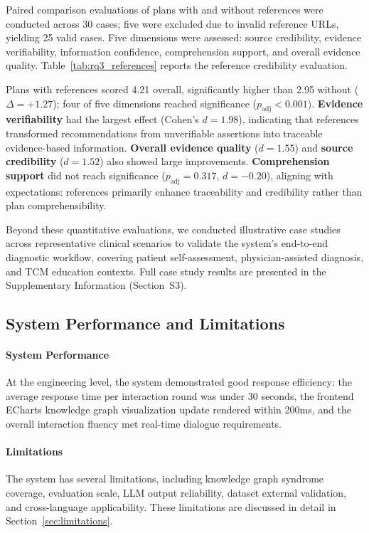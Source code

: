 Paired comparison evaluations of plans with and without references were conducted across 30 cases; five were excluded due to invalid reference URLs, yielding 25 valid cases.
Five dimensions were assessed: source credibility, evidence verifiability, information confidence, comprehension support, and overall evidence quality.
Table~\ref{tab:rq3_references} reports the reference credibility evaluation.



Plans with references scored 4.21 overall, significantly higher than 2.95 without ($\Delta=+1.27$); four of five dimensions reached significance ($p_{\mathrm{adj}}<0.001$).
\textbf{Evidence verifiability} had the largest effect (Cohen's $d=1.98$), indicating that references transformed recommendations from unverifiable assertions into traceable evidence-based information.
\textbf{Overall evidence quality} ($d=1.55$) and \textbf{source credibility} ($d=1.52$) also showed large improvements.
\textbf{Comprehension support} did not reach significance ($p_{\mathrm{adj}}=0.317$, $d=-0.20$), aligning with expectations: references primarily enhance traceability and credibility rather than plan comprehensibility.

Beyond these quantitative evaluations, we conducted illustrative case studies across representative clinical scenarios to validate the system's end-to-end diagnostic workflow, covering patient self-assessment, physician-assisted diagnosis, and TCM education contexts.
Full case study results are presented in the Supplementary Information (Section~S3).

\subsection{System Performance and Limitations}\label{sec:eval-limitations}

\paragraph{System Performance}
At the engineering level, the system demonstrated good response efficiency: the average response time per interaction round was under 30 seconds,
the frontend ECharts knowledge graph visualization update rendered within 200ms, and the overall interaction fluency met real-time dialogue requirements.

\paragraph{Limitations}
The system has several limitations, including knowledge graph syndrome coverage, evaluation scale, LLM output reliability, dataset external validation, and cross-language applicability. These limitations are discussed in detail in Section~\ref{sec:limitations}.
